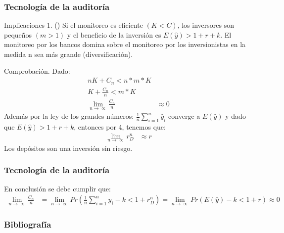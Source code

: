 \documentclass[10pt, xcolor=table, x11names]{beamer}
\begin{document}
\begin{frame}
    \frametitle{{\normalsize Tecnología de la auditoría} {}}
    \begin{block} {Implicaciones 1. (\cite{Diamond1984})}
       Si el monitoreo es eficiente $(K<C)$, los inversores son pequeños $(m>1) $ y el beneficio de la inversión es $ E(\hat{y})>1+r+k$. El monitoreo por los bancos domina sobre el monitoreo por los inversionistas en la medida n sea más grande (diversificación). 
    \end{block}
   Comprobación. Dado:
    \begin{align}
   nK+C_{n}<n*m*K \nonumber\\
   K+\frac{C_{n}}{n}<m*K\nonumber\\
   \lim_{n\rightarrow\propto}\frac{C_{n}}{n}&\approx 0 \nonumber 
   \end{align}
    Además por la ley de los grandes números: $\frac{1}{n}\sum_{i=1}^{n}\hat{y}_{i} $ converge a $E(\hat{y})$ y dado que $ E(\hat{y})>1+r+k$, entonces por 4, tenemos que:
     \begin{align}
    \lim_{n\rightarrow\propto}r_{D}^{n}&\approx r
    \end{align}
    Los depósitos son una inversión sin riesgo.
   
\end{frame}

\begin{frame}
    \frametitle{{\normalsize Tecnología de la auditoría} {}}
    En conclusión se debe cumplir que:
    \begin{align}
    \lim_{n\rightarrow\propto}\frac{C_{n}}{n}&=\lim_{n\rightarrow\propto}Pr(\frac{1}{n}\sum_{i=1}^{n}\hat{y}_{i}-k<1+r_{D}^{n})=\lim_{n\rightarrow\propto}Pr(E(\hat{y})-k<1+r)\approx 0
    \end{align}
\end{frame}


\begin{frame}[allowframebreaks]
    \frametitle{{\large 
            Bibliografía}}
    \renewcommand{\refname}{Referencias}
    
    
\end{frame}
\end{document}
